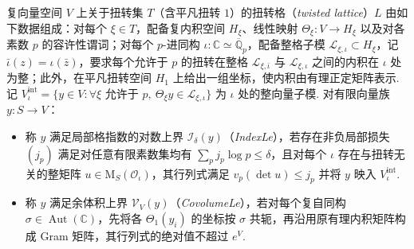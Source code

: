 \begin{definition}
\label{def:twisted-lattice}
\emitthmsource
复向量空间 $V$ 上关于扭转集 $T$（含平凡扭转 $1$）的扭转格（\emph{twisted lattice}）$L$ 由如下数据组成：对每个 $\xi\in T$，配备复内积空间 $H_\xi$、线性映射 $\Theta_\xi\colon V\to H_\xi$ 以及对各素数 $p$ 的容许性谓词；对每个 $p$-进同构 $\iota\colon\mathbb C\simeq\overline{\mathbb Q}_p$，配备整格子模 $\mathcal L_{\xi,\iota}\subset H_\xi$，记 $\bar\iota(z)=\iota(\bar z)$，要求每个允许于 $p$ 的扭转在整格 $\mathcal L_{\xi,\bar\iota}$ 与 $\mathcal L_{\xi,\iota}$ 之间的内积在 $\iota$ 处为整；此外，在平凡扭转空间 $H_1$ 上给出一组坐标，使内积由有理正定矩阵表示.
记 $V_\iota^{\mathrm{int}}=\{y\in V:\forall\xi\text{ 允许于 }p,\ \Theta_\xi y\in\mathcal L_{\xi,\iota}\}$ 为 $\iota$ 处的整向量子模. 对有限向量族 $y\colon S\to V$：
\begin{itemize}
\item 称 $y$ 满足局部格指数的对数上界 $\mathcal I_\delta(y)$（\emph{IndexLe}），若存在非负局部损失 $(j_p)$ 满足对任意有限素数集均有 $\sum_p j_p\log p\le\delta$，且对每个 $\iota$ 存在与扭转无关的整矩阵 $u\in\mathrm M_S(\mathcal O_\iota)$，其行列式满足 $v_p(\det u)\le j_p$ 并将 $y$ 映入 $V_\iota^{\mathrm{int}}$.
\item 称 $y$ 满足余体积上界 $\mathcal V_V(y)$（\emph{CovolumeLe}），若对每个复自同构 $\sigma\in\operatorname{Aut}(\mathbb C)$，先将各 $\Theta_1(y_i)$ 的坐标按 $\sigma$ 共轭，再沿用原有理内积矩阵构成 Gram 矩阵，其行列式的绝对值不超过 $e^V$.
\end{itemize}
\end{definition}


